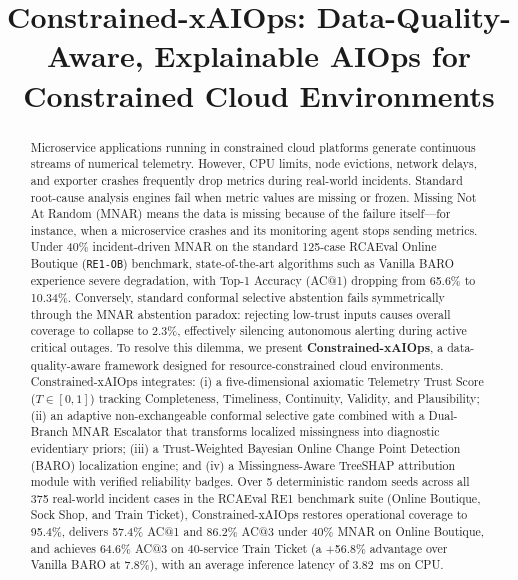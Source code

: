 \documentclass[conference]{IEEEtran}
\begin{document}
\title{Constrained-xAIOps: Data-Quality-Aware, Explainable AIOps for Constrained Cloud Environments}

\author{
}

\maketitle

\begin{abstract}
Microservice applications running in constrained cloud platforms generate continuous streams of numerical telemetry.
However, CPU limits, node evictions, network delays, and exporter crashes frequently drop metrics during real-world incidents.
Standard root-cause analysis engines fail when metric values are missing or frozen.
Missing Not At Random (MNAR) means the data is missing because of the failure itself---for instance, when a microservice crashes and its monitoring agent stops sending metrics.
Under 40\% incident-driven MNAR on the standard 125-case RCAEval Online Boutique (\texttt{RE1-OB}) benchmark, state-of-the-art algorithms such as Vanilla BARO experience severe degradation, with Top-1 Accuracy (AC@1) dropping from 65.6\% to 10.34\%.
Conversely, standard conformal selective abstention fails symmetrically through the MNAR abstention paradox: rejecting low-trust inputs causes overall coverage to collapse to 2.3\%, effectively silencing autonomous alerting during active critical outages.
To resolve this dilemma, we present \textbf{Constrained-xAIOps}, a data-quality-aware framework designed for resource-constrained cloud environments.
Constrained-xAIOps integrates: (i) a five-dimensional axiomatic Telemetry Trust Score ($T \in [0, 1]$) tracking Completeness, Timeliness, Continuity, Validity, and Plausibility; (ii) an adaptive non-exchangeable conformal selective gate combined with a Dual-Branch MNAR Escalator that transforms localized missingness into diagnostic evidentiary priors; (iii) a Trust-Weighted Bayesian Online Change Point Detection (BARO) localization engine; and (iv) a Missingness-Aware TreeSHAP attribution module with verified reliability badges.
Over 5 deterministic random seeds across all 375 real-world incident cases in the RCAEval RE1 benchmark suite (Online Boutique, Sock Shop, and Train Ticket), Constrained-xAIOps restores operational coverage to 95.4\%, delivers 57.4\% AC@1 and 86.2\% AC@3 under 40\% MNAR on Online Boutique, and achieves 64.6\% AC@3 on 40-service Train Ticket (a +56.8\% advantage over Vanilla BARO at 7.8\%), with an average inference latency of 3.82~ms on CPU.
\end{abstract}
\end{document}
